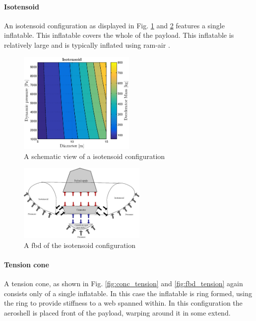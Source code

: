 \paragraph{Isotensoid}

An isotensoid configuration as displayed in Fig. \ref{fig:conc_iso} and \ref{fig:fbd_iso} features a single inflatable. This inflatable covers the whole of the payload. This inflatable is relatively large and is typically inflated using ram-air \cite{Smith2011}. 

\begin{figure}[H]
\centering
\includegraphics[width = 0.5\textwidth]{Figure/ISO_comp.eps}
\caption{A schematic view of a isotensoid configuration}
\label{fig:conc_iso}
\end{figure}

\begin{figure}[H]
\centering
\includegraphics[width = 0.55\textwidth]{Figure/FBD_isotensoid.eps}
\caption{A \gls{fbd} of the isotensoid configuration}
\label{fig:fbd_iso}
\end{figure}

\paragraph{Tension cone}

A tension cone, as shown in Fig. \ref{fig:conc_tension} and \ref{fig:fbd_tension} again consists only of a single inflatable. In this case the inflatable is ring formed, using the ring to provide stiffness to a web spanned within. In this configuration the aeroshell is placed front of the payload, warping around it in some extend.

